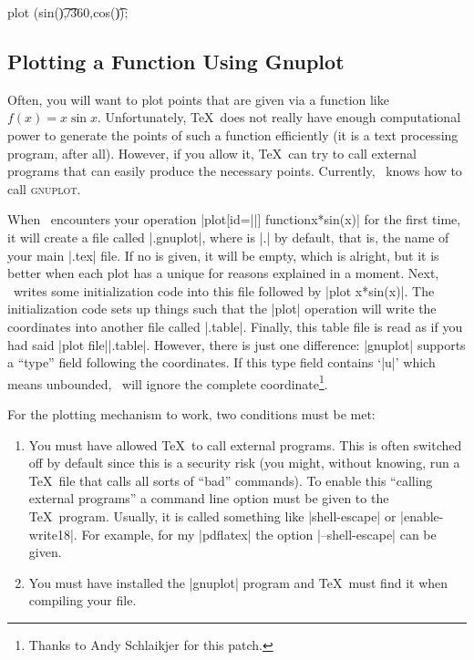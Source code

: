 \begin{codeexample}[]
\tikz \draw[domain=0:360,smooth,variable=\t]
  plot ({sin(\t)},\t/360,{cos(\t)});
\end{codeexample}


\subsection{Plotting a Function Using Gnuplot}
\label{section-tikz-gnuplot}

Often, you will want to plot points that are given via a function like
$f(x) = x \sin x$. Unfortunately, \TeX\ does not really have enough
computational power to generate the points of such a function
efficiently (it is a text processing program, after all). However,
if you allow it, \TeX\ can try to call external programs that can
easily produce the necessary points. Currently, \tikzname\ knows how to
call \textsc{gnuplot}.

When \tikzname\ encounters your operation
|plot[id=||] function{x*sin(x)}| for
the first time, it will create a file called
|.gnuplot|, where  is |\jobname.| by
default, that is, the name of your main |.tex| file. If no  is
given, it will be empty, which is alright, but it is better when each
plot has a unique  for reasons explained in a moment. Next,
\tikzname\ writes some initialization code into this file followed by
|plot x*sin(x)|. The initialization code sets up things
such that the |plot| operation will write the coordinates into another
file called |.table|. Finally, this table file
is read as if you had said |plot file{||.table}|. However,
there is just one difference: |gnuplot| supports a ``type'' field following
the coordinates. If this type field contains `|u|' which means unbounded, \tikzname\ will
ignore the complete coordinate\footnote{Thanks to Andy Schlaikjer for this patch.}.

For the plotting mechanism to work, two conditions must be met:
\begin{enumerate}
\item
  You must have allowed \TeX\ to call external programs. This is often
  switched off by default since this is a security risk (you might,
  without knowing, run a \TeX\ file that calls all sorts of ``bad''
  commands). To enable this ``calling external programs'' a command
  line option must be given to the \TeX\ program. Usually, it is
  called something like |shell-escape| or |enable-write18|. For
  example, for my |pdflatex| the option |--shell-escape| can be
  given.
\item
  You must have installed the |gnuplot| program and \TeX\ must find it
  when compiling your file.
\end{enumerate}

